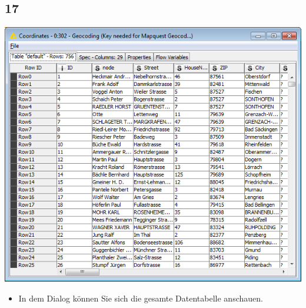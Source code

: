 \documentclass{beamer}
\begin{document}
\subsection{17}
\begin{frame}
	\begin{center}
  		\includegraphics[height=0.6\textheight]{17.png}
	\end{center}
	\begin{itemize}
		\item In dem Dialog können Sie sich die gesamte Datentabelle anschauen.
	\end{itemize}
\end{frame}
\end{document}
